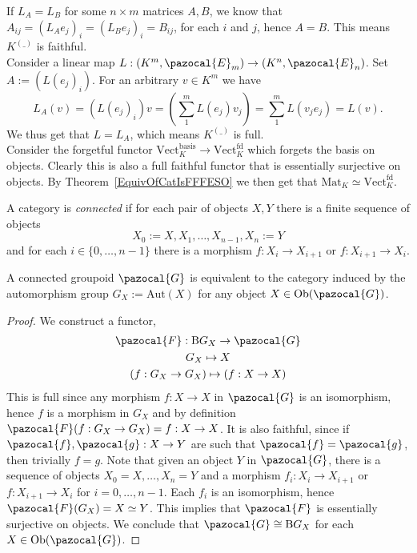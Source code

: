\begin{example}
        If $L_A = L_B$ for some $n\times m$ matrices $A,B$, we know that $A_{ij}=(L_A e_j)_i = (L_B e_j)_i = B_{ij}$, for each $i$ and $j$, hence $A=B$. This means $K^{(\_)}$ is faithful.\\
        Consider a linear map $L : (K^m,\pazocal{E}_m)\rightarrow (K^n,\pazocal{E}_n)$. Set $A:= (L(e_j)_i)$. For an arbitrary $v\in K^m$ we have 
        $$
            L_A (v) = (L(e_j)_i) v = (\sum_1^m L(e_j) v_j)= \sum_1^m L(v_j e_j) = L(v). 
        $$
        We thus get that $L = L_A$, which means $K^{(\_)}$ is full.\\
        Consider the forgetful functor $\mathrm{Vect}_K^\mathrm{basis}\rightarrow \mathrm{Vect}_K^\mathrm{fd}$ which forgets the basis on objects. Clearly this is also a full faithful functor that is essentially surjective on objects. By Theorem~\ref{EquivOfCatIsFFFESO} we then get that $\mathrm{Mat}_K\simeq \mathrm{Vect}_K^\mathrm{fd}$.
    \end{example}
    \begin{definition}
        A category is \emph{connected} if for each pair of objects $X,Y$ there is a finite sequence of objects
        $$
            X_0:= X, X_1,\dots,X_{n-1},X_n := Y
        $$
        and for each $i\in \{0,\dots,n-1\}$ there is a morphism $f : X_i\rightarrow X_{i+1}$ or $f: X_{i+1}\rightarrow X_i$.
    \end{definition}
    \begin{proposition}
        A connected groupoid $\pazocal{G}$ is equivalent to the category induced by the automorphism group $G_X:= \mathrm{Aut}(X)$ for any object $X\in \Ob(\pazocal{G})$.
    \end{proposition}
    \begin{proof}
        We construct a functor, 
        \begin{gather*}
           \pazocal{F}:\mathrm{B}G_X \rightarrow \pazocal{G}\\
           G_X \mapsto X\\ 
           (f : G_X\rightarrow G_X) \mapsto (f: X \rightarrow X) 
        \end{gather*}
        This is full since any morphism $f:X\rightarrow X$ in $\pazocal{G}$ is an isomorphism, hence $f$ is a morphism in $G_X$ and by definition $\pazocal{F}(f: G_X\rightarrow G_X)= f:X\rightarrow X$. It is also faithful, since if $\pazocal{f},\pazocal{g}: X\rightarrow Y$ are such that $\pazocal{f}=\pazocal{g}$, then trivially $f=g$. Note that given an object $Y$ in $\pazocal{G}$, there is a sequence of objects $X_0 = X,\dots,X_n = Y$ and a morphism $f_i : X_i\rightarrow X_{i+1}$ or $f: X_{i+1}\rightarrow X_i$ for $i=0,\dots,n-1$. Each $f_i$ is an isomorphism, hence $\pazocal{F}(G_X)=X\simeq Y$. This implies that $\pazocal{F}$ is essentially surjective on objects. We conclude that $\pazocal{G} \cong \mathrm{B}G_X$ for each $X\in \Ob(\pazocal{G})$.
    \end{proof}
